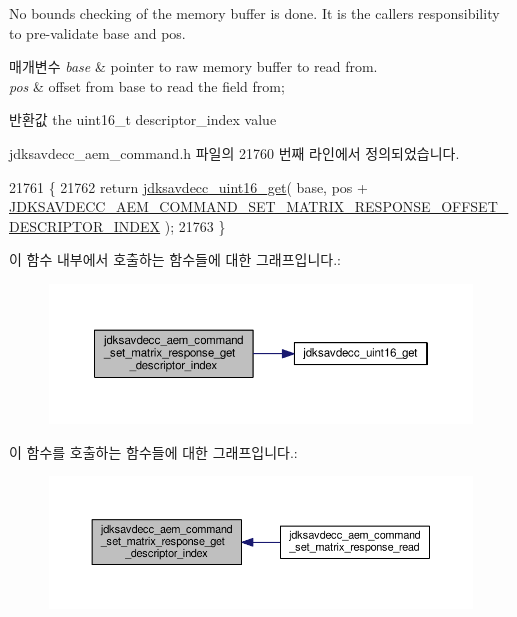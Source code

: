 No bounds checking of the memory buffer is done. It is the caller\textquotesingle{}s responsibility to pre-\/validate base and pos.


\begin{DoxyParams}{매개변수}
{\em base} & pointer to raw memory buffer to read from. \\
\hline
{\em pos} & offset from base to read the field from; \\
\hline
\end{DoxyParams}
\begin{DoxyReturn}{반환값}
the uint16\+\_\+t descriptor\+\_\+index value 
\end{DoxyReturn}


jdksavdecc\+\_\+aem\+\_\+command.\+h 파일의 21760 번째 라인에서 정의되었습니다.


\begin{DoxyCode}
21761 \{
21762     \textcolor{keywordflow}{return} \hyperlink{group__endian_ga3fbbbc20be954aa61e039872965b0dc9}{jdksavdecc\_uint16\_get}( base, pos + 
      \hyperlink{group__command__set__matrix__response_ga68a9c5d637b0e7052024069ef29985e6}{JDKSAVDECC\_AEM\_COMMAND\_SET\_MATRIX\_RESPONSE\_OFFSET\_DESCRIPTOR\_INDEX}
       );
21763 \}
\end{DoxyCode}


이 함수 내부에서 호출하는 함수들에 대한 그래프입니다.\+:
\nopagebreak
\begin{figure}[H]
\begin{center}
\leavevmode
\includegraphics[width=350pt]{group__command__set__matrix__response_ga5775a3ade1a18bc00c578a8071349df0_cgraph}
\end{center}
\end{figure}




이 함수를 호출하는 함수들에 대한 그래프입니다.\+:
\nopagebreak
\begin{figure}[H]
\begin{center}
\leavevmode
\includegraphics[width=350pt]{group__command__set__matrix__response_ga5775a3ade1a18bc00c578a8071349df0_icgraph}
\end{center}
\end{figure}


